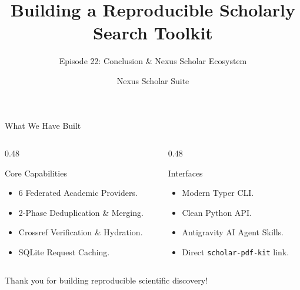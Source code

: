 \documentclass[aspectratio=169]{beamer}
\title{Building a Reproducible Scholarly Search Toolkit}
\subtitle{Episode 22: Conclusion \& Nexus Scholar Ecosystem}
\author{Nexus Scholar Suite}
\date{}
\begin{document}
\begin{frame}[plain]
  \titlepage
\end{frame}

\begin{frame}{What We Have Built}
  \begin{columns}[T]
    \begin{column}{0.48\textwidth}
      \begin{block}{Core Capabilities}
        \begin{itemize}
          \item 6 Federated Academic Providers.
          \item 2-Phase Deduplication \& Merging.
          \item Crossref Verification \& Hydration.
          \item SQLite Request Caching.
        \end{itemize}
      \end{block}
    \end{column}
    \begin{column}{0.48\textwidth}
      \begin{block}{Interfaces}
        \begin{itemize}
          \item Modern Typer CLI.
          \item Clean Python API.
          \item Antigravity AI Agent Skills.
          \item Direct \texttt{scholar-pdf-kit} link.
        \end{itemize}
      \end{block}
    \end{column}
  \end{columns}
\end{frame}

\begin{frame}[standout]
  Thank you for building reproducible scientific discovery!
\end{frame}
\end{document}
